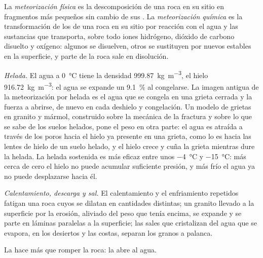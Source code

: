 \begin{definition}\label{def:b1:weathering-clays:weathering}
La \emph{meteorización física} es la descomposición de una roca en su sitio en fragmentos más pequeños
sin cambio de sus . La \emph{meteorización química} es la transformación de los  de una roca
en su sitio por reacción con el agua y las sustancias que transporta, sobre todo iones hidrógeno, dióxido de carbono disuelto y oxígeno:
algunos  se disuelven, otros se sustituyen por  nuevos estables en la superficie, y parte de la roca sale en disolución.
\end{definition}

\emph{Helada.} El agua a \qty{0}{\celsius} tiene la densidad
\qty{999.87}{kg.m^{-3}}, el hielo \qty{916.72}{kg.m^{-3}}: el agua se expande un
\qty{9.1}{\percent} al congelarse. La imagen antigua de la meteorización por helada es
el agua que se congela en una grieta cerrada y la fuerza a abrirse, de nuevo en cada
deshielo y congelación. Un modelo de grietas en granito y mármol, construido sobre la
mecánica de la fractura y sobre lo que se sabe de los suelos helados, pone el peso en otra parte: el agua es atraída a través de los
poros hacia el hielo ya presente en una grieta, como lo es hacia las lentes de hielo de un suelo helado, y el hielo crece y cuña la
grieta mientras dure la helada. La helada sostenida es más eficaz entre unos \qty{-4}{\celsius} y \qty{-15}{\celsius}: más cerca de
cero el hielo no puede acumular suficiente presión, y más frío el agua ya no puede desplazarse hacia él.

\emph{Calentamiento, descarga y sal.} El calentamiento y el enfriamiento repetidos fatigan una roca cuyos  se dilatan en
cantidades distintas; un granito llevado a la superficie por la erosión, aliviado del peso que tenía encima, se expande y se parte en
láminas paralelas a la superficie; las sales que cristalizan del agua que se evapora, en los desiertos y las costas, separan los granos a palanca.

La  hace más que romper la roca: la abre al agua.

